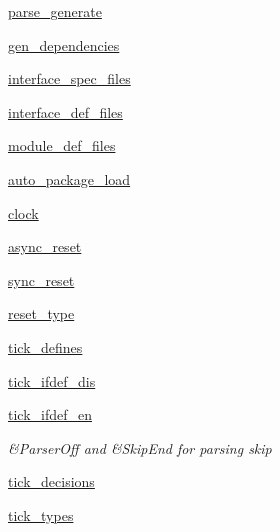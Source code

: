 \begin{DoxyCompactItemize}
\item 
\hyperlink{classsrc_1_1verilog__parser_1_1verilog__parser_a54f0c4a4380a1b9bbdccd108cba9d08f}{parse\-\_\-generate}
\item 
\hyperlink{classsrc_1_1verilog__parser_1_1verilog__parser_a9ca2637cb2fee2c2cc14bef5cefbc55c}{gen\-\_\-dependencies}
\item 
\hyperlink{classsrc_1_1verilog__parser_1_1verilog__parser_a155e7b6f4cfd1a3f02dd900e642cac73}{interface\-\_\-spec\-\_\-files}
\item 
\hyperlink{classsrc_1_1verilog__parser_1_1verilog__parser_aa65e2df4339514dfd088c76ab9306c97}{interface\-\_\-def\-\_\-files}
\item 
\hyperlink{classsrc_1_1verilog__parser_1_1verilog__parser_a3db0cd72db1ddba2c6048d6fece48a34}{module\-\_\-def\-\_\-files}
\item 
\hyperlink{classsrc_1_1verilog__parser_1_1verilog__parser_a78034c322e8a3f31bdac403da9977fcb}{auto\-\_\-package\-\_\-load}
\item 
\hyperlink{classsrc_1_1verilog__parser_1_1verilog__parser_ab6f63afce27653ad48fc243e234c0c29}{clock}
\item 
\hyperlink{classsrc_1_1verilog__parser_1_1verilog__parser_a425456e33f633ca2cbfb13bd2fd05c4f}{async\-\_\-reset}
\item 
\hyperlink{classsrc_1_1verilog__parser_1_1verilog__parser_ae7f406445a30521eda2e92708fa64bae}{sync\-\_\-reset}
\item 
\hyperlink{classsrc_1_1verilog__parser_1_1verilog__parser_a9a7aaf735718fa08e9e442ded25bd33c}{reset\-\_\-type}
\item 
\hyperlink{classsrc_1_1verilog__parser_1_1verilog__parser_aad5fd2ecca89fc5793a69c2d97fdeb8e}{tick\-\_\-defines}
\item 
\hyperlink{classsrc_1_1verilog__parser_1_1verilog__parser_ad6e63fac0c5ab3d3c9ff0ffd7e966fe3}{tick\-\_\-ifdef\-\_\-dis}
\item 
\hyperlink{classsrc_1_1verilog__parser_1_1verilog__parser_a7693c6d544636962a754d3781b3246f9}{tick\-\_\-ifdef\-\_\-en}
\begin{DoxyCompactList}\small\item\em \&Parser\-Off and \&Skip\-End for parsing skip \end{DoxyCompactList}\item 
\hyperlink{classsrc_1_1verilog__parser_1_1verilog__parser_a18f0a3d7b00dc045a831a4c852cb81a9}{tick\-\_\-decisions}
\item 
\hyperlink{classsrc_1_1verilog__parser_1_1verilog__parser_a2f7dedc04e4a32968765ac354243f907}{tick\-\_\-types}

\end{DoxyCompactItemize}
